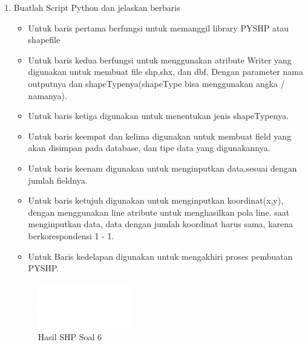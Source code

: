 \begin{enumerate}
	\item Buatlah Script Python dan jelaskan berbaris
	
	\begin{itemize}
		\item Untuk baris pertama berfungsi untuk memanggil library PYSHP atau shapefile
		\item Untuk baris kedua berfungsi untuk menggunakan atribute Writer yang digunakan untuk membuat file shp,shx, dan dbf. \hfill\break Dengan parameter nama outputnya dan shapeTypenya(shapeType bisa menggunakan angka / namanya).
		\item Untuk baris ketiga digunakan untuk menentukan jenis shapeTypenya.
		\item Untuk baris keempat dan kelima digunakan untuk membuat field yang akan disimpan pada database, dan tipe data yang digunakannya.
		\item Untuk baris keenam digunakan untuk menginputkan data,sesuai dengan jumlah fieldnya.
		\item Untuk baris ketujuh digunakan untuk menginputkan koordinat(x,y), dengan menggunakan line atribute untuk menghasilkan pola line. \hfill\break
		saat menginputkan data, data dengan jumlah koordinat harus sama, karena berkorespondensi 1 - 1.
		\item Untuk Baris kedelapan digunakan untuk mengakhiri proses pembuatan PYSHP.
	\end{itemize}
	\hfill\break
	\begin{figure}[H]
		\includegraphics[width=4cm]{figures/1174002/2/6.png}
		\centering
		\caption{Hasil SHP Soal 6}
	\end{figure}


\end{enumerate}
